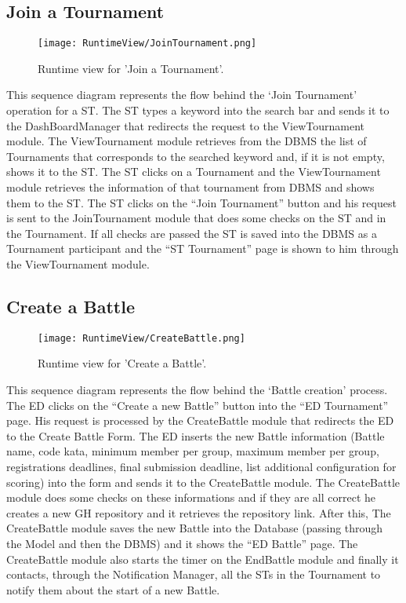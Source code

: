 \subsection{Join a Tournament}
\begin{figure}[H]
    \begin{center}
        \texttt{[image: RuntimeView/JoinTournament.png]}
        \caption{Runtime view for 'Join a Tournament'.}
        \label{fig:runtime_jointournament}%
    \end{center}
\end{figure}
This sequence diagram represents the flow behind the ‘Join Tournament’ operation for a ST.
The ST types a keyword into the search bar and sends it to the DashBoardManager that redirects the request to the ViewTournament module.
The ViewTournament module retrieves from the DBMS the list of Tournaments that corresponds to the searched keyword and, if it is not empty, shows it to the ST. The ST clicks on a Tournament and the ViewTournament module retrieves the information of that tournament from DBMS and shows them to the ST. The ST clicks on the “Join Tournament” button and his request is sent to the JoinTournament module that does some checks on the ST and in the Tournament. If all checks are passed the ST is saved into the DBMS as a Tournament participant and the “ST Tournament” page is shown to him through the ViewTournament module.


\subsection{Create a Battle}
\begin{figure}[H]
    \begin{center}
        \texttt{[image: RuntimeView/CreateBattle.png]}
        \caption{Runtime view for 'Create a Battle'.}
        \label{fig:runtime_createbattle}%
    \end{center}
\end{figure}
This sequence diagram represents the flow behind the ‘Battle creation’ 
process. The ED clicks on the “Create a new Battle” button into the “ED Tournament” page. His request is processed by the CreateBattle module that redirects the ED to the Create Battle Form. The ED inserts the new Battle information (Battle name, code kata,  minimum member per group, maximum member per group, registrations deadlines, final submission deadline, list additional configuration for scoring) into the form and sends it to the CreateBattle module. The CreateBattle module does some checks on these informations and if they are all correct he creates a new GH repository and it retrieves the repository link. After this, The CreateBattle module saves the new Battle into the Database (passing through the Model and then the DBMS) and it shows the “ED Battle” page. The CreateBattle module also starts the timer on the EndBattle module and finally it contacts, through the Notification Manager, all the STs in the Tournament to notify them about the start of a new Battle.



